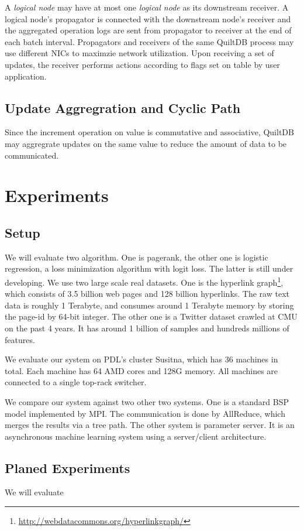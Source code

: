 \documentclass{acm_proc_article-sp}
\begin{document}
A \emph{logical node} may have at most one \emph{logical node} as its downstream
receiver. A logical node's propagator is connected with the downstream node's 
receiver and the aggregated operation logs are sent from propagator to receiver
at the end of each batch interval. Propagators and receivers of the same QuiltDB
process may use different NICs to maximzie network utilization. Upon receiving 
a set of updates, the receiver performs actions according to flags set on table
by user application.

\subsection{Update Aggregration and Cyclic Path}
\label{sec:update-aggreg}
\label{sec:cyclic-path}

Since the increment operation on value is commutative and associative, QuiltDB 
may aggregrate updates on the same value to reduce the amount of data to be 
communicated.



\section{Experiments}

\subsection{Setup}

We will evaluate two algorithm. One is pagerank, the other one is logistic
regression, a loss minimization algorithm with logit loss. The latter is still
under developing. We use two large scale real datasets. One is the hyperlink
graph\footnote{\url{http://webdatacommons.org/hyperlinkgraph/}}, which consists
of 3.5 billion web pages and 128 billion hyperlinks. The raw text data is
roughly 1 Terabyte, and consumes around 1 Terabyte memory by storing the page-id
by 64-bit integer. The other one is a Twitter dataset crawled at CMU on the past
4 years. It has around 1 billion of samples and hundreds millions of
features.

We evaluate our system on PDL's cluster Susitna, which has 36 machines in
total. Each machine has 64 AMD cores and 128G memory. All machines are connected
to a single top-rack switcher.

We compare our system against two other two systems. One is a standard BSP
model implemented by MPI. The communication is done by AllReduce, which merges
the results via a tree path. The other system is parameter server. It is an
asynchronous machine learning system using a server/client architecture.

\subsection{Planed Experiments}

We will evaluate




\end{document}
